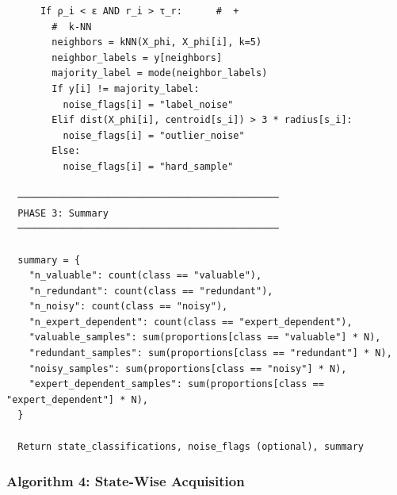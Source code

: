 \documentclass[
  12pt,
]{article}
\begin{document}
\begin{verbatim}
      If ρ_i < ε AND r_i > τ_r:      #  + 
        #  k-NN 
        neighbors = kNN(X_phi, X_phi[i], k=5)
        neighbor_labels = y[neighbors]
        majority_label = mode(neighbor_labels)
        If y[i] != majority_label:
          noise_flags[i] = "label_noise"
        Elif dist(X_phi[i], centroid[s_i]) > 3 * radius[s_i]:
          noise_flags[i] = "outlier_noise"
        Else:
          noise_flags[i] = "hard_sample"

  ──────────────────────────────────────────────
  PHASE 3: Summary
  ──────────────────────────────────────────────

  summary = {
    "n_valuable": count(class == "valuable"),
    "n_redundant": count(class == "redundant"),
    "n_noisy": count(class == "noisy"),
    "n_expert_dependent": count(class == "expert_dependent"),
    "valuable_samples": sum(proportions[class == "valuable"] * N),
    "redundant_samples": sum(proportions[class == "redundant"] * N),
    "noisy_samples": sum(proportions[class == "noisy"] * N),
    "expert_dependent_samples": sum(proportions[class == "expert_dependent"] * N),
  }

  Return state_classifications, noise_flags (optional), summary
\end{verbatim}

\subsubsection{Algorithm 4: State-Wise
Acquisition}\label{algorithm-4-state-wise-acquisition}
\end{document}
